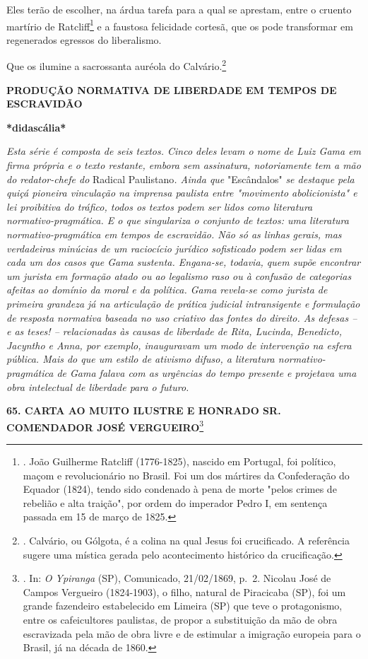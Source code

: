 Eles terão de escolher, na árdua tarefa para a qual se aprestam, entre o
cruento martírio de Ratcliff\footnote{. João Guilherme Ratcliff
  (1776-1825), nascido em Portugal, foi político, maçom e revolucionário
  no Brasil. Foi um dos mártires da Confederação do Equador (1824),
  tendo sido condenado à pena de morte "pelos crimes de rebelião e alta
  traição", por ordem do imperador Pedro I, em sentença passada em 15 de
  março de 1825.} e a faustosa felicidade cortesã, que os pode
transformar em regenerados egressos do liberalismo.

Que os ilumine a sacrossanta auréola do Calvário.\footnote{. Calvário,
  ou Gólgota, é a colina na qual Jesus foi crucificado. A referência
  sugere uma mística gerada pelo acontecimento histórico da
  crucificação.}

\textbf{PRODUÇÃO NORMATIVA DE LIBERDADE EM TEMPOS DE ESCRAVIDÃO}

\textbf{*didascália*}

\emph{Esta série é composta de seis textos. Cinco deles levam o nome de
Luiz Gama em firma própria e o texto restante, embora sem assinatura,
notoriamente tem a mão do redator-chefe do} Radical Paulistano\emph{.
Ainda que} "Escândalos" \emph{se destaque pela quiçá pioneira vinculação
na imprensa paulista entre "movimento abolicionista" e lei proibitiva do
tráfico, todos os textos podem ser lidos como literatura
normativo-pragmática. E o que singulariza o conjunto de textos: uma
literatura normativo-pragmática em tempos de escravidão. Não só as
linhas gerais, mas verdadeiras minúcias de um raciocício jurídico
sofisticado podem ser lidas em cada um dos casos que Gama sustenta.
Engana-se, todavia, quem supõe encontrar um jurista em formação atado ou
ao legalismo raso ou à confusão de categorias afeitas ao domínio da
moral e da política. Gama revela-se como jurista de primeira grandeza já
na articulação de prática judicial intransigente e formulação de
resposta normativa baseada no uso criativo das fontes do direito. As
defesas -- e as teses! -- relacionadas às causas de liberdade de Rita,
Lucinda, Benedicto, Jacyntho e Anna, por exemplo, inauguravam um modo de
intervenção na esfera pública. Mais do que um estilo de ativismo difuso,
a literatura normativo-pragmática de Gama falava com as urgências do
tempo presente e projetava uma obra intelectual de liberdade para o
futuro.}

\textbf{65. CARTA AO MUITO ILUSTRE E HONRADO SR. COMENDADOR JOSÉ
VERGUEIRO}\footnote{. In: \emph{O Ypiranga} (SP), Comunicado,
  21/02/1869, p.~2. Nicolau José de Campos Vergueiro (1824-1903), o
  filho, natural de Piracicaba (SP), foi um grande fazendeiro
  estabelecido em Limeira (SP) que teve o protagonismo, entre os
  cafeicultores paulistas, de propor a substituição da mão de obra
  escravizada pela mão de obra livre e de estimular a imigração europeia
  para o Brasil, já na década de 1860.}

